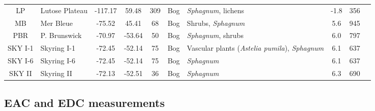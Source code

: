 \documentclass[draft,linenumbers]{agujournal2018}
\begin{document}
\begin{landscape}
\begin{table}
{\begin{tabular}[t]{clcccc>{\raggedright\arraybackslash}p{4cm}cc>{\raggedright\arraybackslash}p{4cm}}
LP & Lutose Plateau & -117.17 & 59.48 & 309 & Bog & \emph{Sphagnum}, lichens & -1.8 & 356 & \citet{Heffernan.2020}\\
\addlinespace
MB & Mer Bleue & -75.52 & 45.41 & 68 & Bog & Shrubs, \emph{Sphagnum} & 5.6 & 945 & \citet{Elliott.2012}\\
PBR & P. Brunswick & -70.97 & -53.64 & 50 & Bog & \emph{Sphagnum}, shrubs & 6.0 & 797 & \citet{Broder.2012}\\
SKY I-1 & Skyring I-1 & -72.45 & -52.14 & 75 & Bog & Vascular plants (\emph{Astelia pumila}), \emph{Sphagnum} & 6.1 & 637 & \citet{Mathijssen.2019}\\
SKY I-6 & Skyring I-6 & -72.45 & -52.14 & 75 & Bog & \emph{Sphagnum} & 6.1 & 637 & \citet{Mathijssen.2019}\\
SKY II & Skyring II & -72.13 & -52.51 & 36 & Bog & \emph{Sphagnum} & 6.3 & 690 & \citet{Broder.2012}\\
\bottomrule
\end{tabular}}
\end{table}
\end{landscape}

\subsection{EAC and EDC measurements}
\end{document}
